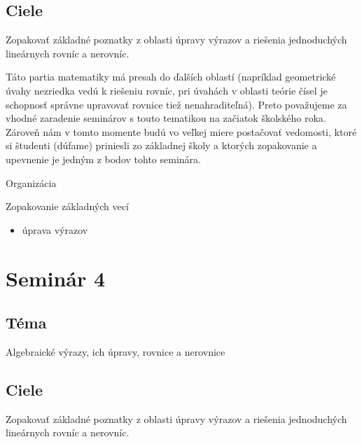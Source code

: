 \subsection*{Ciele}
Zopakovať základné poznatky z oblasti úpravy výrazov a riešenia jednoduchých lineárnych rovníc a nerovníc.

\kom Táto partia matematiky má presah do ďalších oblastí (napríklad geometrické úvahy nezriedka vedú k riešeniu rovníc, pri úvahách v oblasti teórie čísel je schopnosť správne upravovať rovnice tiež nenahraditeľná). Preto považujeme za vhodné zaradenie seminárov s touto tematikou na začiatok školského roka. Zároveň nám v tomto momente budú vo veľkej miere postačovať vedomosti, ktoré si študenti (dúfame) priniesli zo základnej školy a ktorých zopakovanie a upevnenie je jedným z bodov tohto seminára.

Organizácia

Zopakovanie základných vecí
\begin{itemize}
\item úprava výrazov

\end{itemize}

\section*{Seminár 4}
\subsection*{Téma}
Algebraické výrazy, ich úpravy, rovnice a nerovnice

\subsection*{Ciele}
Zopakovať základné poznatky z oblasti úpravy výrazov a riešenia jednoduchých lineárnych rovníc a nerovníc.


\cleardoublepage